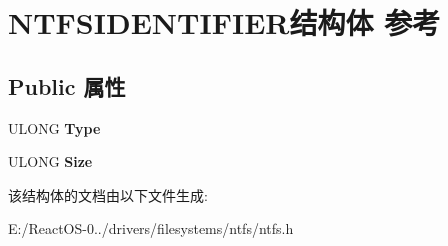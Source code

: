 \hypertarget{struct_n_t_f_s_i_d_e_n_t_i_f_i_e_r}{}\section{N\+T\+F\+S\+I\+D\+E\+N\+T\+I\+F\+I\+E\+R结构体 参考}
\label{struct_n_t_f_s_i_d_e_n_t_i_f_i_e_r}
\subsection*{Public 属性}
\begin{DoxyCompactItemize}
\item 
\mbox{\label{struct_n_t_f_s_i_d_e_n_t_i_f_i_e_r_a124e807ed221d91fa9b4c9c1697410b4}} 
U\+L\+O\+NG {\bfseries Type}
\item 
\mbox{\label{struct_n_t_f_s_i_d_e_n_t_i_f_i_e_r_a9313b3e66ea94422785bc3a9a400f5b3}} 
U\+L\+O\+NG {\bfseries Size}
\end{DoxyCompactItemize}


该结构体的文档由以下文件生成\+:\begin{DoxyCompactItemize}
\item 
E\+:/\+React\+O\+S-\/0../drivers/filesystems/ntfs/ntfs.\+h\end{DoxyCompactItemize}
